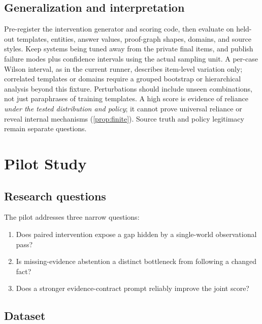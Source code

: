 \documentclass[10pt,twocolumn]{article}
\begin{document}
\subsection{Generalization and interpretation}

Pre-register the intervention generator and scoring code, then evaluate on
held-out templates, entities, answer values, proof-graph shapes, domains,
and source styles. Keep systems being tuned away from the private final
items, and publish failure modes plus confidence intervals using the
actual sampling unit. A per-case Wilson interval, as in the current
runner, describes item-level variation only; correlated templates or
domains require a grouped bootstrap or hierarchical analysis beyond
this fixture. Perturbations should include unseen combinations,
not just paraphrases of training templates. A high score is evidence of
reliance \emph{under the tested distribution and policy}; it cannot prove
universal reliance or reveal internal mechanisms
(\cref{prop:finite}). Source truth and policy legitimacy remain separate
questions.

\section{Pilot Study}

\subsection{Research questions}

The pilot addresses three narrow questions:
\begin{enumerate}[label=\textbf{RQ\arabic*.},leftmargin=*,itemsep=2pt,topsep=3pt]
    \item Does paired intervention expose a gap hidden by a single-world observational pass?
    \item Is missing-evidence abstention a distinct bottleneck from following a changed fact?
    \item Does a stronger evidence-contract prompt reliably improve the joint score?
\end{enumerate}

\subsection{Dataset}
\end{document}
